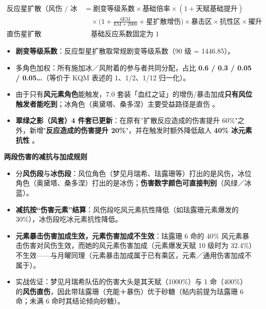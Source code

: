 \[
\begin{aligned}
\text{反应星扩散（风伤 / 冰爆）} &= \text{剧变等级系数} \times \text{基础倍率} \times (1 + \text{天赋基础提升}) \\
&\quad \times \Big(1 + \frac{6\text{EM}}{\text{EM}+2000} + \text{星扩散增伤}\Big) \times \text{暴击区} \times \text{抗性区} \times \text{擢升} \\
\text{直伤星扩散} &\quad \text{基础反应系数固定为 } 1
\end{aligned}
\]

\begin{itemize}
\item \textbf{剧变等级系数}：反应型星扩散取常规剧变等级系数（90 级 = 1446.85）。
\item 多角色加权：所有施加冰／风附着的参与者共同分配，占比 \textbf{0.6 / 0.3 / 0.05 / 0.05…}（等价于 KQM 表述的 1、1/2、1/12 归一化）。
\item 由于只有\textbf{风元素角色}能触发，7.0 套装「血红之证」的增伤/暴击加成\textbf{只有风位触发者能吃到}；冰角色（奥黛塔、桑多涅）主要受益路径是直伤 。
\item \textbf{翠绿之影（风套）4 件套已更新}：在原有”扩散反应造成的伤害提升 60\%"之外，新增"\textbf{反应造成的伤害提升 20\%}"，并在触发时额外降低敌人 \textbf{40\% 冰元素抗性} 。
\end{itemize}

\indent\textbf{两段伤害的减抗与加成规则} 

\begin{itemize}
\item {}分\textbf{风伤段}与\textbf{冰伤段}：风位角色（梦见月瑞希、珐露珊等）打出的是风伤，冰位角色（奥黛塔、桑多涅）打出的是冰伤；\textbf{伤害数字颜色可直接判别}（风绿／冰蓝）。
\item \textbf{减抗按“伤害元素”结算}：风伤段吃风元素抗性降低（如珐露珊元素爆发的 30\%），冰伤段吃冰元素抗性降低。
\item \textbf{元素暴击伤害加成生效，元素伤害加成不生效}：珐露珊 6 命的 40\% 风元素暴击伤害对风伤生效，而她的风元素伤害加成（元素爆发天赋 10 级时为 32.4\%）不生效——与月曜同理（元素暴击加成属于已有乘区，元素／通用伤害加成不属于）。
\item 实战佐证：梦见月瑞希队伍的伤害大头是其天赋（1000\%）与 1 命（400\%）的\textbf{风伤直伤}，因此带珐露珊（充能＋暴伤）优于砂糖（帖内前提为珐露珊 6 命；未满 6 命时其结论倾向砂糖）。
\end{itemize}

\medskip
